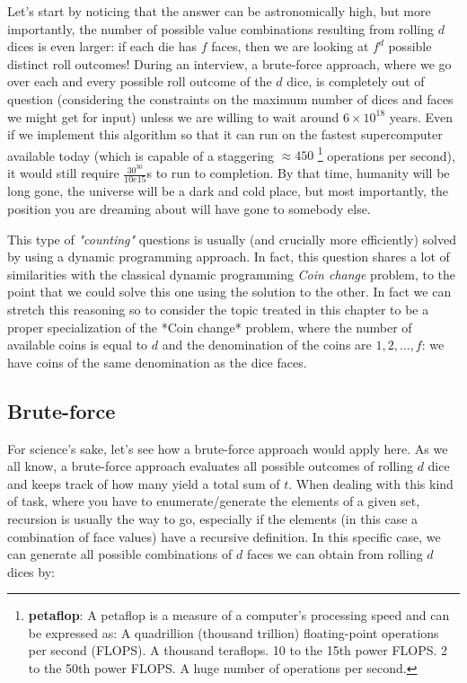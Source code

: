 Let's start by noticing that the answer can be astronomically high, but more importantly, the number of possible value combinations resulting from rolling $d$ dices is even larger: if each die has
$f$ faces, then we are looking at $f^d$ possible distinct roll outcomes! 
During an interview, a brute-force approach, where we go over each and every possible roll outcome of the $d$ dice, is completely out of question  (considering the constraints on the maximum number of dices and faces we might get for input) unless we are willing to wait around  $6 \times 10^{18}$ years. Even if we implement this algorithm so that it can run on the fastest supercomputer available today (which is capable of a staggering $\approx450$ \footnote{\textbf{petaflop}: A petaflop is a measure of a computer's processing speed and can be expressed as: A quadrillion (thousand trillion) floating-point operations per second (FLOPS). A thousand teraflops. 10 to the 15th power FLOPS. 2 to the 50th power FLOPS. A huge number of operations per second.} operations per second), it would still require $\frac{30^{30}}{10e15}$s to run to completion. By that time, humanity will be long gone, the universe will be a dark and cold place, but most importantly, the position you are dreaming about will have gone to somebody else.

This type of \textit{"counting"} questions is usually (and crucially more efficiently) solved by using a dynamic programming
approach. In fact, this question shares a lot of similarities with the classical dynamic programming
\textit{Coin change} problem, to the point that we
could solve this one using the solution to the other. In fact we can stretch this reasoning so to consider the topic treated in this chapter to be a proper specialization of the *Coin
change* problem, where the number of available coins is equal to $d$
and the denomination of the coins are $1,2,\ldots,f$: we have coins of the same denomination as the
dice faces.




\subsection{Brute-force}
\label{dice_rolls:sec:bruteforce}


For science's sake, let's see how a brute-force approach would apply here. As we all know, a brute-force approach evaluates all possible outcomes of rolling $d$ dice and keeps
track of how many yield a total sum of $t$. When dealing with this kind of task, where you have to
enumerate/generate the elements of a given set, recursion is usually the way to go, especially if the elements (in this case a combination of face values) have a recursive definition.
In this specific case, we can generate all possible combinations of $d$ faces we can obtain from rolling $d$ dices by:

